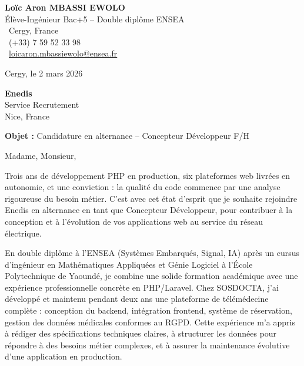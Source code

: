 \documentclass[a4paper,11pt]{article}
\begin{document}
\noindent
\begin{minipage}[t]{0.5\textwidth}
    \textbf{Loïc Aron MBASSI EWOLO}\\
    Élève-Ingénieur Bac+5 -- Double diplôme ENSEA\\[3pt]
    \faMapMarker\ Cergy, France\\
    \faPhone\ (+33) 7 59 52 33 98\\
    \faEnvelope\ \href{mailto:loicaron.mbassiewolo@ensea.fr}{loicaron.mbassiewolo@ensea.fr}
\end{minipage}
\hfill
\begin{minipage}[t]{0.4\textwidth}
    \raggedleft
    Cergy, le 2 mars 2026
\end{minipage}

\vspace{1.2cm}

\hfill
\begin{minipage}[t]{0.5\textwidth}
    \raggedleft
    \textbf{Enedis}\\
    Service Recrutement\\
    Nice, France
\end{minipage}

\vspace{1cm}

\noindent\textbf{Objet :} Candidature en alternance -- Concepteur Développeur F/H

\vspace{0.8cm}

Madame, Monsieur,

Trois ans de développement PHP en production, six plateformes web livrées en autonomie, et une conviction : la qualité du code commence par une analyse rigoureuse du besoin métier. C'est avec cet état d'esprit que je souhaite rejoindre Enedis en alternance en tant que Concepteur Développeur, pour contribuer à la conception et à l'évolution de vos applications web au service du réseau électrique.

En double diplôme à l'ENSEA (Systèmes Embarqués, Signal, IA) après un cursus d'ingénieur en Mathématiques Appliquées et Génie Logiciel à l'École Polytechnique de Yaoundé, je combine une solide formation académique avec une expérience professionnelle concrète en PHP/Laravel. Chez SOSDOCTA, j'ai développé et maintenu pendant deux ans une plateforme de télémédecine complète : conception du backend, intégration frontend, système de réservation, gestion des données médicales conformes au RGPD. Cette expérience m'a appris à rédiger des spécifications techniques claires, à structurer les données pour répondre à des besoins métier complexes, et à assurer la maintenance évolutive d'une application en production.
\end{document}
